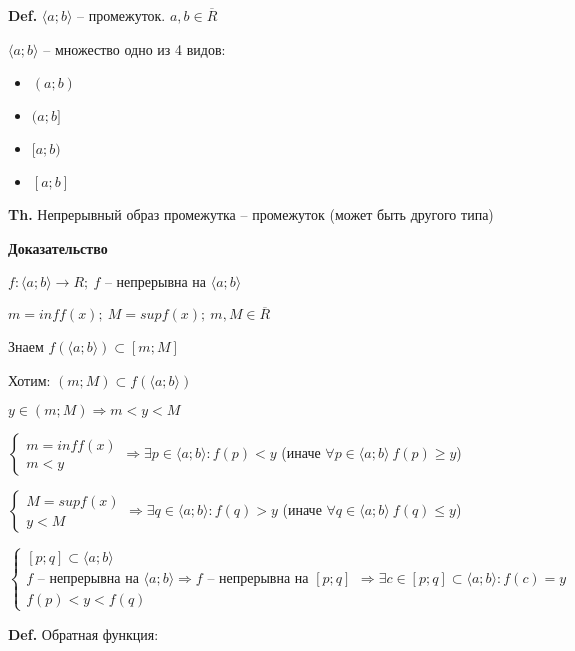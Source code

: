 \documentclass[14pt, letter paper]{article}
\newcommand{\q}[1]{\langle #1 \rangle}
\begin{document}
\vspace{5mm}

\textbf{Def.} $\q{a; b}$ -- промежуток. $a, b \in \overline{R}$

$\q{a; b}$ -- множество одно из 4 видов:

\begin{itemize}
    \item $(a; b)$ 
    \item $(a; b]$
    \item $[a; b)$
    \item $[a; b]$
\end{itemize}

\textbf{Th.} Непрерывный образ промежутка -- промежуток (может быть другого типа)

\begin{center}
    \textbf{Доказательство}
\end{center}

$f : \q{a; b} \rightarrow R;\ f$ -- непрерывна на $\q{a; b}$

$m = inff(x);\ M = supf(x);\ m, M \in \overline{R}$

Знаем $f(\q{a; b}) \subset [m; M]$

Хотим: $(m; M) \subset f(\q{a; b})$

$y \in (m; M) \Rightarrow m < y < M$

$\begin{cases}
    m = inff(x) \\
    m < y
\end{cases} \Rightarrow \exists p \in \q{a; b} : f(p) < y$ (иначе $\forall p \in \q{a; b}\ f(p) \geq y$)

$\begin{cases}
    M = supf(x) \\
    y < M
\end{cases} \Rightarrow \exists q \in \q{a; b} : f(q) > y$ (иначе $\forall q \in \q{a; b}\ f(q) \leq y$)

$\begin{cases}
    [p; q] \subset \q{a; b} \\
    f \text{ -- непрерывна на } \q{a; b} \Rightarrow f \text{ -- непрерывна на } [p; q] \\
    f(p) < y < f(q)
\end{cases} \Rightarrow \exists c \in [p; q] \subset \q{a; b} : f(c) = y$

\vspace{5mm}

\textbf{Def.} Обратная функция:
\end{document}
